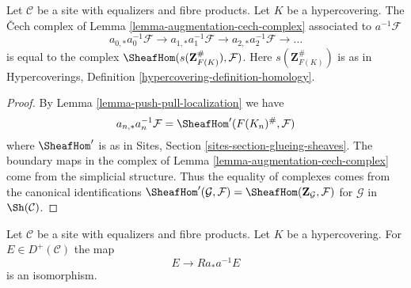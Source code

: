 \begin{lemma}
\label{lemma-hypercovering-cech-complex}
Let $\mathcal{C}$ be a site with equalizers and fibre products.
Let $K$ be a hypercovering. The {\v C}ech complex
of Lemma \ref{lemma-augmentation-cech-complex} associated to
$a^{-1}\mathcal{F}$
$$
a_{0, *}a_0^{-1}\mathcal{F} \to a_{1, *}a_1^{-1}\mathcal{F} \to
a_{2, *}a_2^{-1}\mathcal{F} \to \ldots
$$
is equal to the complex $\SheafHom(s(\mathbf{Z}_{F(K)}^\#), \mathcal{F})$.
Here $s(\mathbf{Z}_{F(K)}^\#)$ is as in
Hypercoverings, Definition \ref{hypercovering-definition-homology}.
\end{lemma}

\begin{proof}
By Lemma \ref{lemma-push-pull-localization} we have
$$
a_{n, *}a_n^{-1}\mathcal{F} = \SheafHom'(F(K_n)^\#, \mathcal{F})
$$
where $\SheafHom'$ is as in Sites, Section \ref{sites-section-glueing-sheaves}.
The boundary maps in the complex of
Lemma \ref{lemma-augmentation-cech-complex}
come from the simplicial structure.
Thus the equality of complexes comes 
from the canonical identifications
$\SheafHom'(\mathcal{G}, \mathcal{F}) =
\SheafHom(\mathbf{Z}_\mathcal{G}, \mathcal{F})$ for
$\mathcal{G}$ in $\Sh(\mathcal{C})$.
\end{proof}

\begin{lemma}
\label{lemma-hypercovering-descent-bounded-abelian}
Let $\mathcal{C}$ be a site with equalizers and fibre products.
Let $K$ be a hypercovering. For
$E \in D^+(\mathcal{C})$ the map
$$
E \longrightarrow Ra_*a^{-1}E
$$
is an isomorphism.
\end{lemma}

